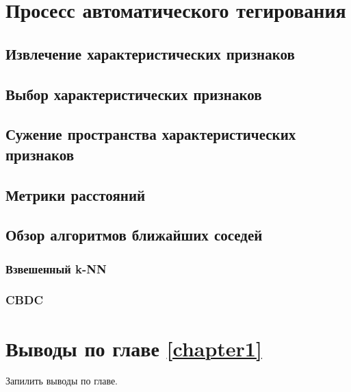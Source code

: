 \section{Просесс автоматического тегирования}

\subsection{Извлечение характеристических признаков}
\subsection{Выбор характеристических признаков}
\subsection{Сужение пространства характеристических признаков}
\subsection{Метрики расстояний}
\subsection{Обзор алгоритмов ближайших соседей}
\subsubsection{Взвешенный k-NN}
\subsubsection{CBDC}

\section{Выводы по главе \ref{chapter1}}
Запилить выводы по главе.





